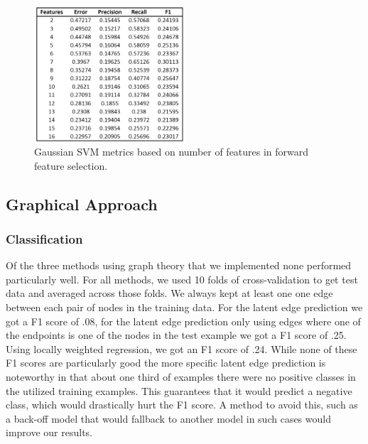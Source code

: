 \documentclass[twoside,twocolumn,paper=letter,fontsize=11pt]{article}
\begin{document}
\begin{figure}
      \centering
          \includegraphics[width=0.5\textwidth]{../figs/ClassificationMetrics_RbfSVM.png}
  \caption{Gaussian SVM metrics based on number of features in forward feature selection.}
  \label{fig:rbf_svm_vis}
\end{figure}


\subsection{Graphical Approach}
\subsubsection*{Classification}

Of the three methods using graph theory that we implemented none performed
particularly well. For all methods, we used 10 folds of cross-validation
to get test data and averaged across those folds. We always kept at least one
one edge between each pair of nodes in the training data. For the latent edge
prediction we got a F1 score of .08, for the latent edge prediction only using
edges where one of the endpoints is one of the nodes in the test example we got
a F1 score of .25. Using locally weighted regression, we got an F1 score of
.24. While none of these F1 scores are particularly good the more specific
latent edge prediction is noteworthy in that about one third of examples there
were no positive classes in the utilized training examples. This guarantees
that it would predict a negative class, which would drastically hurt the F1
score. A method to avoid this, such as a back-off model that would
fallback to another model in such cases would improve our results.\\
\end{document}
